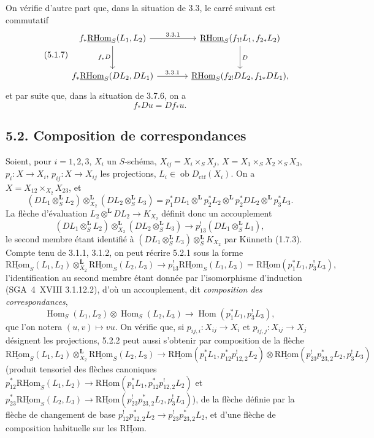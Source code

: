 \documentclass[11pt]{article}
\DeclareMathOperator{\Hom}{Hom}
\providecommand{\RHom}{\mathrm{RHom}}
\providecommand{\uRHom}{\underline{\RHom}}
\providecommand{\RHom}{\mathrm{RHom}}
\providecommand{\Hom}{\operatorname{Hom}}
\providecommand{\RHom}{\mathrm R\mathcal{H}om}
\providecommand{\RHom}{\mathrm{RHom}}
\providecommand{\Hom}{\operatorname{Hom}}
\begin{document}
On vérifie d'autre part que, dans la situation de 3.3, le carré suivant est commutatif
\begin{equation}
\tag{5.1.7}
\begin{tikzcd}[column sep=large,row sep=large]
f_*\uRHom_S(L_1,L_2) \arrow[r,"3.3.1"] \arrow[d,"f_*D"']
& \uRHom_S(f_{1!}L_1,f_{2*}L_2) \arrow[d,"D"] \\
f_*\uRHom_S(DL_2,DL_1) \arrow[r,"3.3.1"]
& \uRHom_S(f_{2!}DL_2,f_{1*}DL_1),
\end{tikzcd}
\end{equation}
et par suite que, dans la situation de 3.7.6, on a
\begin{equation}
\tag{5.1.8}
f_*Du=Df_*u.
\end{equation}

\subsection*{5.2. Composition de correspondances}

Soient, pour $i=1,2,3$, $X_i$ un $S$-schéma, $X_{ij}=X_i\times_SX_j$, $X=X_1\times_SX_2\times_SX_3$, $p_i:X\to X_i$, $p_{ij}:X\to X_{ij}$ les projections, $L_i\in\operatorname{ob}D_{\mathrm{ctf}}(X_i)$. On a $X=X_{12}\times_{X_2}X_{23}$, et
\[
(DL_1\otimes_S^{\mathbf L}L_2)\otimes_{X_2}^{\mathbf L}(DL_2\otimes_S^{\mathbf L}L_3)
=p_1^*DL_1\otimes^{\mathbf L}p_2^*L_2\otimes^{\mathbf L}p_2^*DL_2\otimes^{\mathbf L}p_3^*L_3.
\]
La flèche d'évaluation $L_2\otimes^{\mathbf L}DL_2\to K_{X_2}$ définit donc un accouplement
\begin{equation}
\tag{5.2.1}
(DL_1\otimes_S^{\mathbf L}L_2)\otimes_{X_2}^{\mathbf L}(DL_2\otimes_S^{\mathbf L}L_3)\longrightarrow p_{13}^!(DL_1\otimes_S^{\mathbf L}L_3),
\end{equation}
le second membre étant identifié à $(DL_1\otimes_S^{\mathbf L}L_3)\otimes_S^{\mathbf L}K_{X_2}$ par Künneth (1.7.3). Compte tenu de 3.1.1, 3.1.2, on peut récrire 5.2.1 sous la forme
\begin{equation}
\tag{5.2.2}
\uRHom_S(L_1,L_2)\otimes_{X_2}^{\mathbf L}\uRHom_S(L_2,L_3)\longrightarrow p_{13}^!\uRHom_S(L_1,L_3)=\uRHom(p_1^*L_1,p_3^!L_3),
\end{equation}
l'identification au second membre étant donnée par l'isomorphisme d'induction (SGA~4~XVIII 3.1.12.2), d'où un accouplement, dit \emph{composition des correspondances},
\begin{equation}
\tag{5.2.3}
\Hom_S(L_1,L_2)\otimes\Hom_S(L_2,L_3)\longrightarrow\Hom(p_1^*L_1,p_3^!L_3),
\end{equation}
que l'on notera $(u,v)\mapsto vu$. On vérifie que, si $p_{ij,i}:X_{ij}\to X_i$ et $p_{ij,j}:X_{ij}\to X_j$ désignent les projections, 5.2.2 peut aussi s'obtenir par composition de la flèche
\[
\uRHom_S(L_1,L_2)\otimes_{X_2}^{\mathbf L}\uRHom_S(L_2,L_3)
\longrightarrow
\uRHom(p_1^*L_1,p_{12}^*p_{12,2}^!L_2)
\otimes
\uRHom(p_{23}^!p_{23,2}^*L_2,p_3^!L_3)
\]
(produit tensoriel des flèches canoniques $p_{12}^*\uRHom_S(L_1,L_2)\to\uRHom(p_1^*L_1,p_{12}^*p_{12,2}^!L_2)$ et $p_{23}^*\uRHom_S(L_2,L_3)\to\uRHom(p_{23}^!p_{23,2}^*L_2,p_3^!L_3)$), de la flèche définie par la flèche de changement de base $p_{12}^!p_{12,2}^*L_2\to p_{23}^!p_{23,2}^*L_2$, et d'une flèche de composition habituelle sur les $\uRHom$.
\end{document}
